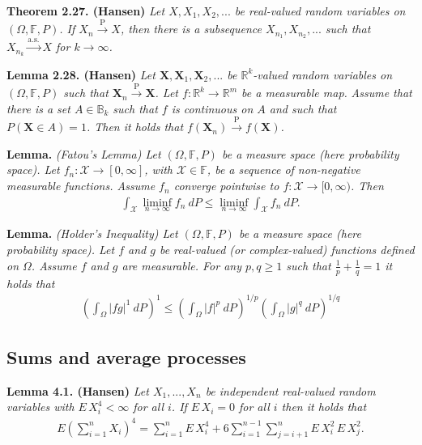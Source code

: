 \documentclass[a4paper,10pt,openany]{book}
\begin{document}
\textbf{Theorem 2.27. (Hansen)} \emph{Let \(X,X_1,X_2,...\) be real-valued random variables on \((\Omega,\mathbb{F},P)\). If \(X_n\stackrel{\text{P}}{\to} X\), then there is a subsequence \(X_{n_1},X_{n_2},...\) such that \(X_{n_k}\stackrel{\text{a.s.}}{\to} X\) for \(k\to \infty\).}

\textbf{Lemma 2.28. (Hansen)} \emph{Let \(\mathbf{X},\mathbf{X}_1,\mathbf{X}_2,...\) be \(\mathbb{R}^k\)-valued random variables on \((\Omega,\mathbb{F},P)\) such that \(\mathbf{X}_n\stackrel{\text{P}}{\to} \mathbf{X}\). Let \(f : \mathbb{R}^k\to \mathbb{R}^m\) be a measurable map.}
\emph{Assume that there is a set \(A\in\mathbb{B}_k\) such that \(f\) is continuous on \(A\) and such that \(P(\mathbf{X}\in A)=1\). Then it holds that \(f(\mathbf{X}_n)\stackrel{\text{P}}{\to} f(\mathbf{X})\).}

\textbf{Lemma.} \emph{(Fatou's Lemma) Let \((\Omega,\mathbb{F},P)\) be a measure space (here probability space). Let \(f_n : \mathcal{X} \to [0,\infty]\), with \(\mathcal{X}\in\mathbb{F}\), be a sequence of non-negative measurable functions. Assume \(f_n\) converge pointwise to \(f : \mathcal{X}\to [0,\infty)\). Then}
\begin{align*}
    \int_{\mathcal{X}} \liminf_{n\to\infty} f_n\ dP\le \liminf_{n\to\infty} \int_{\mathcal{X}} f_n\ dP.
\end{align*}

\textbf{Lemma.} \emph{(Holder's Inequality)  Let \((\Omega,\mathbb{F},P)\) be a measure space (here probability space). Let \(f\) and \(g\) be real-valued (or complex-valued) functions defined on \(\Omega\). Assume \(f\) and \(g\) are measurable. For any \(p,q\ge 1\) such that \(\frac{1}{p}+\frac{1}{q}=1\) it holds that }
\begin{align*}
    \left(\int_\Omega \vert fg\vert^1\ dP\right)^1\le \left(\int_\Omega \vert f\vert^p\ dP\right)^{1/p}\left(\int_\Omega \vert g\vert^q\ dP\right)^{1/q}
\end{align*}

\hypertarget{sums-and-average-processes}{%
\subsection{Sums and average processes}\label{sums-and-average-processes}}

\textbf{Lemma 4.1. (Hansen)} \emph{Let \(X_1,...,X_n\) be independent real-valued random variables with \(E\, X_i^4<\infty\) for all \(i\). If \(E\, X_i=0\) for all \(i\) then it holds that}
\begin{align*}
    E\left(\sum_{i=1}^n X_i\right)^4=\sum_{i=1}^n E\, X_i^4+6\sum_{i=1}^{n-1}\sum_{j=i+1}^n E\, X_i^2\,E\,X_j^2.
\end{align*}
\end{document}
